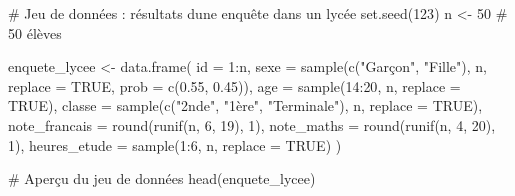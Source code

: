 \documentclass[
  french,
  11pt,
  a4paper,
]{article}
\newenvironment{Shaded}{}{}
\newcommand{\AttributeTok}[1]{\textcolor[rgb]{0.84,0.23,0.29}{#1}}
\newcommand{\CommentTok}[1]{\textcolor[rgb]{0.42,0.45,0.49}{#1}}
\newcommand{\ConstantTok}[1]{\textcolor[rgb]{0.00,0.36,0.77}{#1}}
\newcommand{\DecValTok}[1]{\textcolor[rgb]{0.00,0.36,0.77}{#1}}
\newcommand{\FloatTok}[1]{\textcolor[rgb]{0.00,0.36,0.77}{#1}}
\newcommand{\FunctionTok}[1]{\textcolor[rgb]{0.44,0.26,0.76}{#1}}
\newcommand{\NormalTok}[1]{\textcolor[rgb]{0.14,0.16,0.18}{#1}}
\newcommand{\OtherTok}[1]{\textcolor[rgb]{0.44,0.26,0.76}{#1}}
\newcommand{\SpecialCharTok}[1]{\textcolor[rgb]{0.00,0.36,0.77}{#1}}
\newcommand{\StringTok}[1]{\textcolor[rgb]{0.01,0.18,0.38}{#1}}
\begin{document}
\begin{Shaded}
\begin{Highlighting}[]
\CommentTok{\# Jeu de données : résultats d\textquotesingle{}une enquête dans un lycée}
\FunctionTok{set.seed}\NormalTok{(}\DecValTok{123}\NormalTok{)}
\NormalTok{n }\OtherTok{\textless{}{-}} \DecValTok{50}  \CommentTok{\# 50 élèves}

\NormalTok{enquete\_lycee }\OtherTok{\textless{}{-}} \FunctionTok{data.frame}\NormalTok{(}
  \AttributeTok{id =} \DecValTok{1}\SpecialCharTok{:}\NormalTok{n,}
  \AttributeTok{sexe =} \FunctionTok{sample}\NormalTok{(}\FunctionTok{c}\NormalTok{(}\StringTok{"Garçon"}\NormalTok{, }\StringTok{"Fille"}\NormalTok{), n, }\AttributeTok{replace =} \ConstantTok{TRUE}\NormalTok{, }\AttributeTok{prob =} \FunctionTok{c}\NormalTok{(}\FloatTok{0.55}\NormalTok{, }\FloatTok{0.45}\NormalTok{)),}
  \AttributeTok{age =} \FunctionTok{sample}\NormalTok{(}\DecValTok{14}\SpecialCharTok{:}\DecValTok{20}\NormalTok{, n, }\AttributeTok{replace =} \ConstantTok{TRUE}\NormalTok{),}
  \AttributeTok{classe =} \FunctionTok{sample}\NormalTok{(}\FunctionTok{c}\NormalTok{(}\StringTok{"2nde"}\NormalTok{, }\StringTok{"1ère"}\NormalTok{, }\StringTok{"Terminale"}\NormalTok{), n, }\AttributeTok{replace =} \ConstantTok{TRUE}\NormalTok{),}
  \AttributeTok{note\_francais =} \FunctionTok{round}\NormalTok{(}\FunctionTok{runif}\NormalTok{(n, }\DecValTok{6}\NormalTok{, }\DecValTok{19}\NormalTok{), }\DecValTok{1}\NormalTok{),}
  \AttributeTok{note\_maths =} \FunctionTok{round}\NormalTok{(}\FunctionTok{runif}\NormalTok{(n, }\DecValTok{4}\NormalTok{, }\DecValTok{20}\NormalTok{), }\DecValTok{1}\NormalTok{),}
  \AttributeTok{heures\_etude =} \FunctionTok{sample}\NormalTok{(}\DecValTok{1}\SpecialCharTok{:}\DecValTok{6}\NormalTok{, n, }\AttributeTok{replace =} \ConstantTok{TRUE}\NormalTok{)}
\NormalTok{)}

\CommentTok{\# Aperçu du jeu de données}
\FunctionTok{head}\NormalTok{(enquete\_lycee)}
\end{Highlighting}
\end{Shaded}

 
  \providecommand{\huxb}[2]{\arrayrulecolor[RGB]{#1}\global\arrayrulewidth=#2pt}
  \providecommand{\huxvb}[2]{\color[RGB]{#1}\vrule width #2pt}
  \providecommand{\huxtpad}[1]{\rule{0pt}{#1}}
  \providecommand{\huxbpad}[1]{\rule[-#1]{0pt}{#1}}
\end{document}
